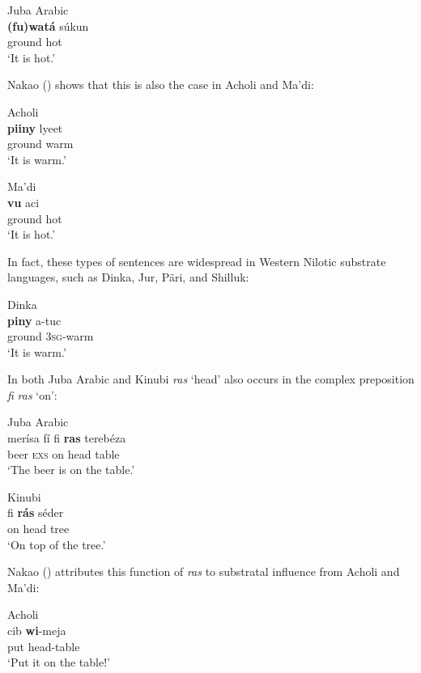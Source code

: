 \documentclass[output=paper]{langsci/langscibook}
\begin{document}
\ea\label{ex:key:}
{Juba Arabic \citep[141]{Nakao2012}}\\
\gll   \textbf{(fu)watá} súkun\\
       ground hot\\
\glt     `It is hot.'
\z

Nakao (\citeyear[141]{Nakao2012}) shows that this is also the case in Acholi and Ma'di:

\ea\label{ex:key:}
{Acholi \citep[141]{Nakao2012}}\\
\gll \textbf{piiny} lyeet\\
     ground warm\\
\glt     `It is warm.'
\z

\ea\label{ex:key:}
{Ma'di \citep[141]{Nakao2012}}\\
\gll \textbf{vu} aci\\
     ground hot\\
\glt     `It is hot.'
\z

In fact, these types of sentences are widespread in Western Nilotic substrate languages, such as Dinka, Jur, Päri, and Shilluk:

\ea\label{ex:key:}
{Dinka \citep[202]{Nebel1979}}\\
\gll            \textbf{piny} a-tuc\\
                ground 3\textsc{sg}-warm\\
\glt     `It is warm.'
\z

  In both Juba Arabic and Kinubi \textit{ras} ‘head’ also occurs in the complex preposition \textit{fi} \textit{ras} ‘on’:

\ea\label{ex:key:}
\ea Juba Arabic \citep[141]{Nakao2012}\\
\gll     merísa fí fi \textbf{ras} terebéza\\
         beer \textsc{exs} on head table\\
\glt       `The beer is on the table.'

\ex\label{ex:key:}
Kinubi \citep[159]{Wellens2003}\\
\gll     fi \textbf{rá}\textbf{s} séder\\
         on head tree\\
\glt       `On top of the tree.'
\z
\z

Nakao (\citeyear[141]{Nakao2012}) attributes this function of \textit{ras} to substratal influence from Acholi and Ma'di:

\ea\label{ex:key:}
{Acholi \citep[141]{Nakao2012}}\\
\gll            cib \textbf{wi}-meja\\
                put head-table\\
\glt     `Put it on the table!'
\z
 
\end{document}
